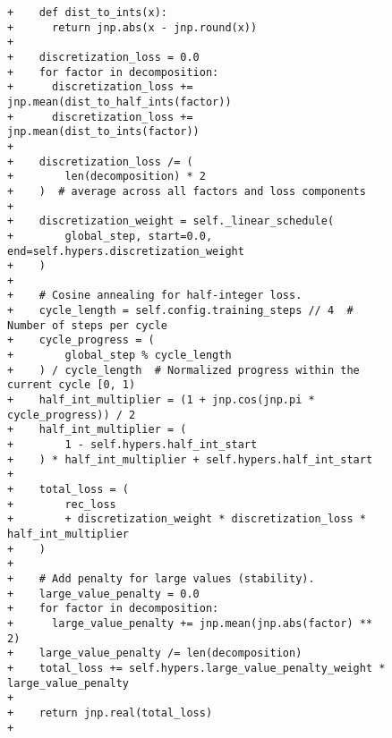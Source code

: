 \begin{figure}[p]
\renewcommand{\thefigure}{\arabic{figure}c}\vspace{-0.03\textwidth}
\begin{adjustbox}{width=0.9\textwidth}
\begin{minipage}{0.9\textwidth}
\begin{lstlisting}[style=pydiff, backgroundcolor=\color{backcolour}, firstnumber=131]
+    def dist_to_ints(x):
+      return jnp.abs(x - jnp.round(x))
+
+    discretization_loss = 0.0
+    for factor in decomposition:
+      discretization_loss += jnp.mean(dist_to_half_ints(factor))
+      discretization_loss += jnp.mean(dist_to_ints(factor))
+
+    discretization_loss /= (
+        len(decomposition) * 2
+    )  # average across all factors and loss components
+
+    discretization_weight = self._linear_schedule(
+        global_step, start=0.0, end=self.hypers.discretization_weight
+    )
+
+    # Cosine annealing for half-integer loss.
+    cycle_length = self.config.training_steps // 4  # Number of steps per cycle
+    cycle_progress = (
+        global_step % cycle_length
+    ) / cycle_length  # Normalized progress within the current cycle [0, 1)
+    half_int_multiplier = (1 + jnp.cos(jnp.pi * cycle_progress)) / 2
+    half_int_multiplier = (
+        1 - self.hypers.half_int_start
+    ) * half_int_multiplier + self.hypers.half_int_start
+
+    total_loss = (
+        rec_loss
+        + discretization_weight * discretization_loss * half_int_multiplier
+    )
+
+    # Add penalty for large values (stability).
+    large_value_penalty = 0.0
+    for factor in decomposition:
+      large_value_penalty += jnp.mean(jnp.abs(factor) ** 2)
+    large_value_penalty /= len(decomposition)
+    total_loss += self.hypers.large_value_penalty_weight * large_value_penalty
+
+    return jnp.real(total_loss)
+
 

\end{lstlisting}
\end{minipage}
\end{adjustbox}
\end{figure}
